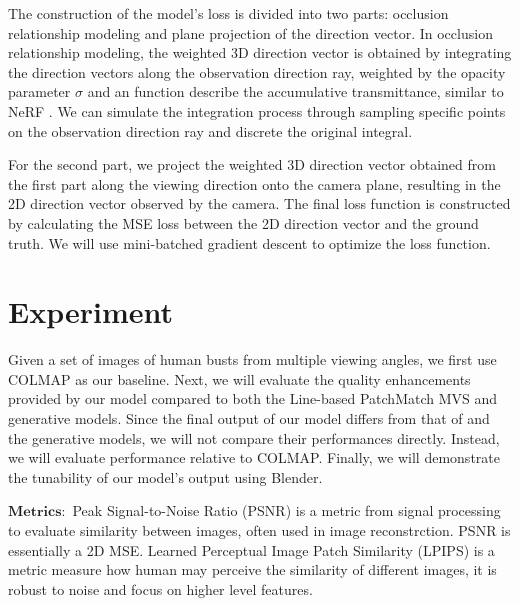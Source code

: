 \documentclass[12pt]{article}
\begin{document}
    The construction of the model's loss is divided into two parts: occlusion relationship modeling and plane projection of the direction vector. In occlusion relationship modeling, the weighted 3D direction vector is obtained by integrating the direction vectors along the observation direction ray, weighted by the opacity parameter $\sigma$ and an function describe the accumulative transmittance, similar to NeRF \cite{mildenhall_nerf_2020}. We can simulate the integration process through sampling specific points on the observation direction ray and discrete the original integral.

    For the second part, we project the weighted 3D direction vector obtained from the first part along the viewing direction onto the camera plane, resulting in the 2D direction vector observed by the camera. The final loss function is constructed by calculating the MSE loss between the 2D direction vector and the ground truth. We will use mini-batched gradient descent to optimize the loss function.
    
  \section{Experiment}

  Given a set of images of human busts from multiple viewing angles, we first use COLMAP as our baseline. Next, we will evaluate the quality enhancements provided by our model compared to both the Line-based PatchMatch MVS \cite{nam_strand-accurate_nodate} and generative models. Since the final output of our model differs from that of \cite{nam_strand-accurate_nodate} and the generative models, we will not compare their performances directly. Instead, we will evaluate performance relative to COLMAP. Finally, we will demonstrate the tunability of our model's output using Blender.

  $\mathbf{Metrics:}$ Peak Signal-to-Noise Ratio (PSNR) is a metric from signal processing to evaluate similarity between images, often used in image reconstrction. PSNR is essentially a 2D MSE. Learned Perceptual Image Patch Similarity (LPIPS) is a metric measure how human may perceive the similarity of different images, it is robust to noise and focus on higher level features.
  
  

  \printbibliography
\end{document}
